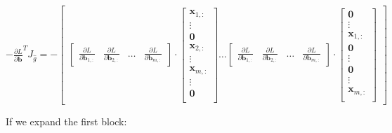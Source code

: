 \documentclass{article}
\begin{document}
\begin{center}
    $ -\frac{\partial L}{\partial \mathbf{b}}^{T} J_{\widehat{g}} = 
    -\begin{bmatrix} \begin{bmatrix}
        \frac{\partial L}{\partial \mathbf{b}_{1,:}} & \frac{\partial L}{\partial \mathbf{b}_{2,:}} & \hdots & \frac{\partial L}{\partial \mathbf{b}_{m,:}}
    \end{bmatrix} \cdot
    \begin{bmatrix}
     \mathbf{x}_{1,:}  \\
       \vdots\\
    \textbf{0} \\
     \mathbf{x}_{2,:} \\
      \vdots\\
     \mathbf{x}_{m,:} \\
    \vdots\\
    \textbf{0} \\
\end{bmatrix} \hdots 
    \begin{bmatrix}
        \frac{\partial L}{\partial \mathbf{b}_{1,:}} & \frac{\partial L}{\partial \mathbf{b}_{2,:}} & \hdots & \frac{\partial L}{\partial \mathbf{b}_{m,:}}
    \end{bmatrix} \cdot
    \begin{bmatrix}
      \textbf{0} \\
       \vdots\\
    \mathbf{x}_{1,:} \\
      \textbf{0} \\
      \vdots\\
      \textbf{0}\\
    \vdots\\
    \mathbf{x}_{m,:} \\
\end{bmatrix}
\end{bmatrix}$
\end{center}
If we expand the first block:
\end{document}
